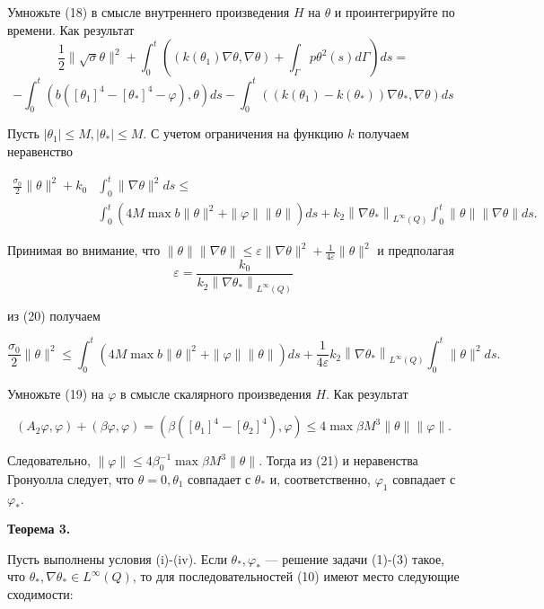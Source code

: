 Умножьте (18) в смысле внутреннего произведения $H$ на $\theta$ и проинтегрируйте по времени.
Как результат
$$
\frac{1}{2}\|\sqrt{\sigma} \theta\|^{2}+
\int_{0}^{t}\left(\left(k\left(\theta_{1}\right) \nabla \theta,
\nabla \theta\right)+\int_{\Gamma} p \theta^{2}(s) d \Gamma\right) d s=
$$
$$
-\int_{0}^{t}\left(b\left(\left[\theta_{1}\right]^{4}-\left[\theta_{*}\right]^{4}-\varphi\right),
\theta\right) d s-\int_{0}^{t}\left(\left(k\left(\theta_{1}\right)-k\left(\theta_{*}\right)\right)
\nabla \theta_{*}, \nabla \theta\right) d s
$$

Пусть $\left|\theta_{1}\right| \leq M,\left|\theta_{*}\right| \leq M$.
С учетом ограничения на функцию $k$ получаем неравенство

$$
\begin{aligned}
    \frac{\sigma_{0}}{2}\|\theta\|^{2}+k_{0} & \int_{0}^{t}\|\nabla \theta\|^{2} d s \leq \\
    & \int_{0}^{t}\left(4 M \max b\|\theta\|^{2}+\|\varphi\|\|\theta\|\right) d s
    +k_{2}\left\|\nabla \theta_{*}\right\|_{L^{\infty}(Q)} \int_{0}^{t}\|\theta\|\|\nabla \theta\| d s.
\end{aligned}
$$

Принимая во внимание, что
$\|\theta\|\|\nabla \theta\| \leq \varepsilon\|\nabla \theta\|^{2}+\frac{1}{4 \varepsilon}\|\theta\|^{2}$
и предполагая
$$
\varepsilon=\frac{k_{0}}{k_{2}\left\|\nabla \theta_{*}\right\|_{L^{\infty}(Q)}}
$$

из (20) получаем

$$
\frac{\sigma_{0}}{2}\|\theta\|^{2} \leq \int_{0}^{t}
\left(4 M \max b\|\theta\|^{2}+\|\varphi\|\|\theta\|\right) d s
+\frac{1}{4 \varepsilon} k_{2}\left\|\nabla \theta_{*}\right\|_{L^{\infty}(Q)} \int_{0}^{t}\|\theta\|^{2} d s.
$$

Умножьте (19) на $\varphi$ в смысле скалярного произведения $H$.
Как результат

$$
\left(A_{2} \varphi, \varphi\right)+(\beta \varphi, \varphi)=
\left(\beta\left(\left[\theta_{1}\right]^{4}-\left[\theta_{2}\right]^{4}\right), \varphi\right)
\leq 4 \max \beta M^{3}\|\theta\|\|\varphi\|.
$$

Следовательно, $\|\varphi\| \leq 4 \beta_{0}^{-1} \max \beta M^{3}\|\theta\|$.
Тогда из (21) и неравенства Гронуолла следует, что $\theta=0, \theta_{1}$
совпадает с $\theta_{*}$ и, соответственно, $\varphi_{1}$ совпадает с $\varphi_{*}$.

\textbf{Теорема 3.}

Пусть выполнены условия (i)-(iv).
Если $\theta_{*}, \varphi_{*}$ — решение задачи (1)-(3) такое,
что $\theta_{*}, \nabla \theta_{*} \in L^{\infty }(Q)$,
то для последовательностей (10) имеют место следующие сходимости:

